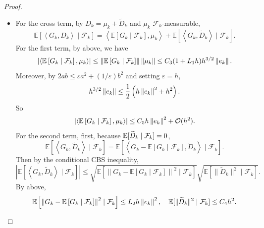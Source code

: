 \begin{proof}
\begin{itemize}
        \item For the cross term, by $D_k = \mu_k + \widetilde{D}_k$ and $\mu_k$ $\mathcal{F}_k$-measurable,
        \begin{equation*}
            \mathbb{E}\left[\left\langle G_k, D_k\right\rangle \mid \mathcal{F}_k\right]=\left\langle\mathbb{E}\left[G_k \mid \mathcal{F}_k\right], \mu_k\right\rangle+\mathbb{E}\left[\left\langle G_k, \widetilde{D}_k\right\rangle \mid \mathcal{F}_k\right] .
        \end{equation*}
        For the first term, by above, we have
        \begin{equation*}
            \left\lvert\left\langle\mathbb{E}\left[G_k \mid \mathcal{F}_k\right], \mu_k\right\rangle\right\lvert \leq \left\lVert\mathbb{E}\left[G_k \mid \mathcal{F}_k\right]\right\lVert\left\lVert\mu_k\right\lVert \leq C_3(1+L_1h)h^{3/2}\left\lVert e_k\right\lVert.
        \end{equation*}
        Moreover, by $2ab \leq \varepsilon a^2 + (1/\varepsilon)b^2$ and setting $\varepsilon=h$,
        \begin{equation*}
            h^{3/2}\left\lVert e_k\right\lVert \leq \frac{1}{2}\left(h\left\lVert e_k\right\lVert^2 + h^2\right).
        \end{equation*}
        So
        \begin{equation*}
            \left\lvert\left\langle\mathbb{E}\left[G_k \mid \mathcal{F}_k\right], \mu_k\right\rangle\right\lvert \leq C_5h \left\lVert e_k\right\lVert^2 +  \mathcal{O}(h^2).
        \end{equation*}
        For the second term, first, because $\mathbb{E}[\widetilde{D}_k \mid \mathcal{F}_k] = 0$,
        \begin{equation*}
            \mathbb{E}\left[\left\langle G_k, \widetilde{D}_k\right\rangle \mid \mathcal{F}_k\right]=\mathbb{E}\left[\left\langle G_k-\mathbb{E}\left[G_k \mid \mathcal{F}_k\right], \widetilde{D}_k\right\rangle \mid \mathcal{F}_k\right].
        \end{equation*}
        Then by the conditional CBS inequality,
        \begin{equation*}
            \left|\mathbb{E}\left[\left\langle G_k, \widetilde{D}_k\right\rangle \mid \mathcal{F}_k\right]\right| \leq \sqrt{\mathbb{E}\left[\left\|G_k-\mathbb{E}\left[G_k \mid \mathcal{F}_k\right]\right\|^2 \mid \mathcal{F}_k\right]} \sqrt{\mathbb{E}[\|\widetilde{D}_k\|^2 \mid \mathcal{F}_k]}.
        \end{equation*}
        By above, 
        \begin{equation*}
            \mathbb{E}\left[\left\|G_k-\mathbb{E}\left[G_k \mid \mathcal{F}_k\right]\right\|^2 \mid \mathcal{F}_k\right] \leq L_2 h \norm{e_k}^2,\quad \mathbb{E}[\|\widetilde{D}_k\|^2 \mid \mathcal{F}_k]\leq C_4h^2.

\end{equation*}
\end{itemize}
\end{proof}

